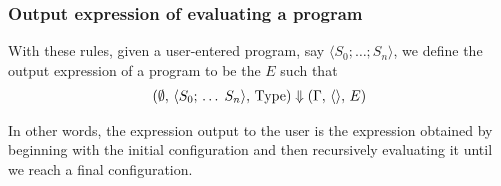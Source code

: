 \documentclass{article}
\begin{document}
\subsubsection{Output expression of evaluating a program}
With these rules, given a user-entered program, say $\langle S_0;
\dots; S_n \rangle$, we define the
output expression of a program to be the $E$ such that
\begin{align*}
  (\emptyset, \, \langle S_0; \, \dots \; S_n \rangle, \, \operatorname{Type}) \Downarrow
  (\Gamma, \, \langle \rangle, \, E)
\end{align*}

In other words, the expression output to the user is the expression obtained by
beginning with the initial configuration and then recursively evaluating it
until we reach a final configuration.
\end{document}
